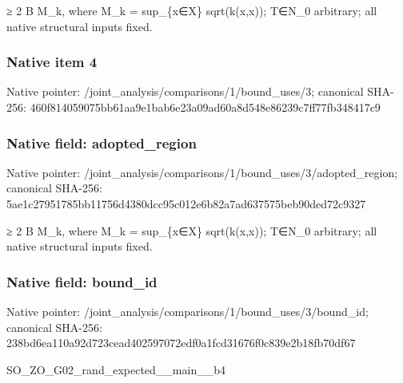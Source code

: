\documentclass[10pt,a4paper]{article}
\begin{document}
\begingroup\raggedright{}\allowbreak{} {\AtlasUnicodeSymbols ≥}\allowbreak{} 2 B M\_\allowbreak{}k,\allowbreak{} where M\_\allowbreak{}k =\allowbreak{} sup\_\allowbreak{}\{x{\AtlasUnicodeSymbols ∈}\allowbreak{}X\} sqrt(k(x,\allowbreak{}x));\allowbreak{} T{\AtlasUnicodeSymbols ∈}\allowbreak{}N\_\allowbreak{}0 arbitrary;\allowbreak{} all native structural inputs fixed.\par\endgroup

\subsubsection{Native item 4}
Native pointer: /joint\_\allowbreak{}analysis/comparisons/1/bound\_\allowbreak{}uses/3; canonical SHA-256: 460f814059075bb61aa9e1bab6e23a09ad60a8d548e86239c7ff77fb348417c9

\subsubsection{Native field: adopted\_\allowbreak{}region}
Native pointer: /joint\_\allowbreak{}analysis/comparisons/1/bound\_\allowbreak{}uses/3/adopted\_\allowbreak{}region; canonical SHA-256: 5ae1c27951785bb11756d4380dcc95c012e6b82a7ad637575beb90ded72c9327

\begingroup\raggedright{}\allowbreak{} {\AtlasUnicodeSymbols ≥}\allowbreak{} 2 B M\_\allowbreak{}k,\allowbreak{} where M\_\allowbreak{}k =\allowbreak{} sup\_\allowbreak{}\{x{\AtlasUnicodeSymbols ∈}\allowbreak{}X\} sqrt(k(x,\allowbreak{}x));\allowbreak{} T{\AtlasUnicodeSymbols ∈}\allowbreak{}N\_\allowbreak{}0 arbitrary;\allowbreak{} all native structural inputs fixed.\par\endgroup

\subsubsection{Native field: bound\_\allowbreak{}id}
Native pointer: /joint\_\allowbreak{}analysis/comparisons/1/bound\_\allowbreak{}uses/3/bound\_\allowbreak{}id; canonical SHA-256: 238bd6ea110a92d723cead402597072edf0a1fcd31676f0c839e2b18fb70df67

\begingroup\raggedright\sloppy SO\_\allowbreak{}ZO\_\allowbreak{}G02\_\allowbreak{}rand\_\allowbreak{}expected\_\allowbreak{}\_\allowbreak{}main\_\allowbreak{}\_\allowbreak{}b4\par\endgroup
\end{document}
